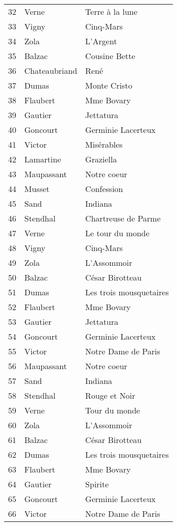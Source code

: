 \begin{table}
\begin{tabular}{|l|l|l|}
    32 & Verne & Terre à la lune \\
    33 & Vigny & Cinq-Mars \\
    34 & Zola & L'Argent \\
    35 & Balzac & Cousine Bette \\
    36 & Chateaubriand & René \\
    37 & Dumas & Monte Cristo \\
    38 & Flaubert & Mme Bovary \\
    39 & Gautier & Jettatura \\
    40 & Goncourt & Germinie Lacerteux \\
    41 & Victor & Misérables \\
    42 & Lamartine & Graziella \\
    43 & Maupassant & Notre coeur \\
    44 & Musset & Confession \\
    45 & Sand & Indiana \\
    46 & Stendhal & Chartreuse de Parme \\
    47 & Verne & Le tour du monde \\
    48 & Vigny & Cinq-Mars \\
    49 & Zola & L'Assommoir \\
    50 & Balzac & César Birotteau \\
    51 & Dumas & Les trois mousquetaires \\
    52 & Flaubert & Mme Bovary \\
    53 & Gautier & Jettatura \\
    54 & Goncourt & Germinie Lacerteux \\
    55 & Victor & Notre Dame de Paris \\
    56 & Maupassant & Notre coeur \\
    57 & Sand & Indiana \\
    58 & Stendhal & Rouge et Noir \\
    59 & Verne & Tour du monde \\
    60 & Zola & L'Assommoir \\
    61 & Balzac & César Birotteau \\
    62 & Dumas & Les trois mousquetaires \\
    63 & Flaubert & Mme Bovary \\
    64 & Gautier & Spirite \\
    65 & Goncourt & Germinie Lacerteux \\
    66 & Victor & Notre Dame de Paris \\

\end{tabular}
\end{table}
